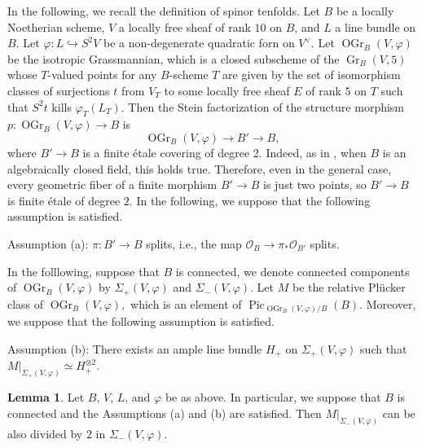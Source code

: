 \documentclass[autodetect-engine, a4paper]{amsart}
\theoremstyle{definition}
\newtheorem{lem}[thm]{Lemma}
\def\cO{\mathcal{O}}
\DeclareMathOperator\Pic{\mathrm{Pic}}
\DeclareMathOperator\Gr{\mathrm{Gr}}
\DeclareMathOperator\OGr{\mathrm{OGr}}
\newcommand{\cred}{\color{black}}
\begin{document}
{\cred In the following, we recall the definition of spinor tenfolds}.
Let $B$ be a locally Noetherian scheme, 
$V$ a locally free sheaf of rank $10$ on $B$, and $L$ a line bundle on $B$.
{\cred Let $\varphi \colon L \hookrightarrow S^2 V$ be a non-degenerate quadratic forn on $V^{\vee}$.}
Let $\OGr_B (V, \varphi)$ be the isotropic Grassmannian, which is a closed subscheme of the 
{\cred $\Gr_{B} (V,5)$}
whose $T$-valued points {\cred for any $B$-scheme $T$} are given by the set of isomorphism classes of surjections $t$ from $V_{T}$ to some locally free sheaf $E$ of rank $5$ on $T$ such that $S^2 t$ kills $\varphi_{T} (L_{T})$.
Then the Stein factorization of the structure morphism $p \colon \OGr_B(V,\varphi) \rightarrow B$ is 
\[
\OGr_B (V, \varphi) \rightarrow B' \rightarrow B,
\]
where $B' \rightarrow B$ is a finite \'{e}tale covering of degree 2.
Indeed, as in \cite{Mukaicurve}, when $B$ is an algebraically closed field, this holds true.
Therefore, even in the general case, every geometric fiber of a finite morphism $B' \rightarrow B$ is just two points, so $B' \rightarrow B$ is finite \'{e}tale of degree $2$.
In the following, we suppose that the following assumption is satisfied.

Assumption (a):
{\cred $\pi \colon B' \rightarrow B$ splits, i.e., the map $\cO_B \to \pi_* \cO_{B'}$ splits.}

{\cred In the folllowing, suppose that $B$ is connected,} we denote connected components of $\OGr_B (V,\varphi)$ by $\Sigma_{+} (V,\varphi)$ and $\Sigma_{-} (V, \varphi)$.
Let $M$ be the relative Pl\"{u}cker class of $\OGr_B (V, \varphi),$ which is an element of $\Pic_{\OGr_{B} (V, \varphi)/B} (B)$.
Moreover, we suppose that the following assumption is satisfied.

Assumption (b):
There exists an ample line bundle $H_{+}$ on $\Sigma_{+} (V, \varphi)$ such that
$M|_{\Sigma_{+} (V, \varphi)} \simeq H_{+}^{\otimes 2}$. 




\begin{lem}
\label{lem:pmindep}
Let $B$, $V$, $L$, and $\varphi$ be as above.
In particular, we suppose that $B$ is connected and the Assumptions (a) and (b) are satisfied. 
Then $M|_{\Sigma_{-} (V, \varphi)}$ can be also divided by $2$ in $\Sigma_{-} (V, \varphi)$.
\end{lem}
\end{document}
